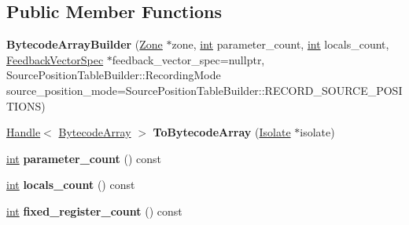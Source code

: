 \subsection*{Public Member Functions}
\begin{DoxyCompactItemize}
\item 
\mbox{\label{classv8_1_1internal_1_1interpreter_1_1BytecodeArrayBuilder_a004f92e9c14473af533e0441df577ae4}} 
{\bfseries Bytecode\+Array\+Builder} (\mbox{\hyperlink{classv8_1_1internal_1_1Zone}{Zone}} $\ast$zone, \mbox{\hyperlink{classint}{int}} parameter\+\_\+count, \mbox{\hyperlink{classint}{int}} locals\+\_\+count, \mbox{\hyperlink{classv8_1_1internal_1_1FeedbackVectorSpec}{Feedback\+Vector\+Spec}} $\ast$feedback\+\_\+vector\+\_\+spec=nullptr, Source\+Position\+Table\+Builder\+::\+Recording\+Mode source\+\_\+position\+\_\+mode=Source\+Position\+Table\+Builder\+::\+R\+E\+C\+O\+R\+D\+\_\+\+S\+O\+U\+R\+C\+E\+\_\+\+P\+O\+S\+I\+T\+I\+O\+NS)
\item 
\mbox{\label{classv8_1_1internal_1_1interpreter_1_1BytecodeArrayBuilder_a465d04e577e21cb5549a450eaa622a99}} 
\mbox{\hyperlink{classv8_1_1internal_1_1Handle}{Handle}}$<$ \mbox{\hyperlink{classv8_1_1internal_1_1BytecodeArray}{Bytecode\+Array}} $>$ {\bfseries To\+Bytecode\+Array} (\mbox{\hyperlink{classv8_1_1internal_1_1Isolate}{Isolate}} $\ast$isolate)
\item 
\mbox{\label{classv8_1_1internal_1_1interpreter_1_1BytecodeArrayBuilder_a14a89731c42071e2f84a215b7a03c167}} 
\mbox{\hyperlink{classint}{int}} {\bfseries parameter\+\_\+count} () const
\item 
\mbox{\label{classv8_1_1internal_1_1interpreter_1_1BytecodeArrayBuilder_a42546e86753615c79ca953c41d55ece2}} 
\mbox{\hyperlink{classint}{int}} {\bfseries locals\+\_\+count} () const
\item 
\mbox{\label{classv8_1_1internal_1_1interpreter_1_1BytecodeArrayBuilder_af05dc4512b03875c5f1186cdd6a2d292}} 
\mbox{\hyperlink{classint}{int}} {\bfseries fixed\+\_\+register\+\_\+count} () const
\item 

\end{DoxyCompactItemize}
